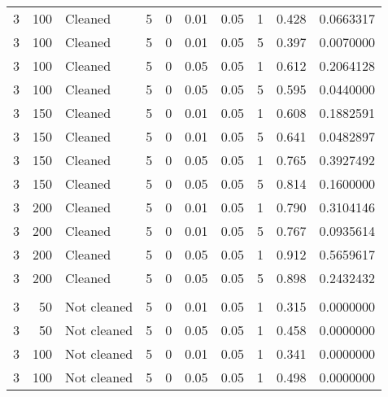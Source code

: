 \begin{table}
{{\begin{tabular}{rrlrrrrrrr}
\hspace{1em}3 & 100 & Cleaned & 5 & 0 & 0.01 & 0.05 & 1 & 0.428 & 0.0663317\\
\hspace{1em}3 & 100 & Cleaned & 5 & 0 & 0.01 & 0.05 & 5 & 0.397 & 0.0070000\\
\hspace{1em}3 & 100 & Cleaned & 5 & 0 & 0.05 & 0.05 & 1 & 0.612 & 0.2064128\\
\hspace{1em}3 & 100 & Cleaned & 5 & 0 & 0.05 & 0.05 & 5 & 0.595 & 0.0440000\\
\hspace{1em}3 & 150 & Cleaned & 5 & 0 & 0.01 & 0.05 & 1 & 0.608 & 0.1882591\\
\hspace{1em}3 & 150 & Cleaned & 5 & 0 & 0.01 & 0.05 & 5 & 0.641 & 0.0482897\\
\hspace{1em}3 & 150 & Cleaned & 5 & 0 & 0.05 & 0.05 & 1 & 0.765 & 0.3927492\\
\hspace{1em}3 & 150 & Cleaned & 5 & 0 & 0.05 & 0.05 & 5 & 0.814 & 0.1600000\\
\hspace{1em}3 & 200 & Cleaned & 5 & 0 & 0.01 & 0.05 & 1 & 0.790 & 0.3104146\\
\hspace{1em}3 & 200 & Cleaned & 5 & 0 & 0.01 & 0.05 & 5 & 0.767 & 0.0935614\\
\hspace{1em}3 & 200 & Cleaned & 5 & 0 & 0.05 & 0.05 & 1 & 0.912 & 0.5659617\\
\hspace{1em}3 & 200 & Cleaned & 5 & 0 & 0.05 & 0.05 & 5 & 0.898 & 0.2432432\\
\addlinespace[0.3em]
\multicolumn{10}{l}{\textbf{$t_3$ Distribution}}\\
\hspace{1em}3 & 50 & Not cleaned & 5 & 0 & 0.01 & 0.05 & 1 & 0.315 & 0.0000000\\
\hspace{1em}3 & 50 & Not cleaned & 5 & 0 & 0.05 & 0.05 & 1 & 0.458 & 0.0000000\\
\hspace{1em}3 & 100 & Not cleaned & 5 & 0 & 0.01 & 0.05 & 1 & 0.341 & 0.0000000\\
\hspace{1em}3 & 100 & Not cleaned & 5 & 0 & 0.05 & 0.05 & 1 & 0.498 & 0.0000000\\

\end{tabular}}}
\end{table}
